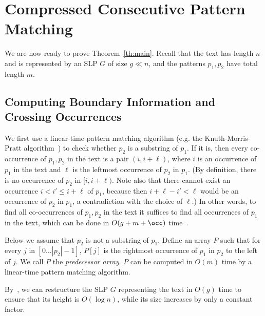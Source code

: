  
\section{Compressed Consecutive Pattern Matching}
\label{pmgapped:sec:consec}
We are now ready to prove Theorem~\ref{th:main}. Recall that the text has length $n$ and is represented by an SLP $G$ of size $g \ll n$, and the patterns $p_1,p_2$ have total length $m$.

\subsection{Computing Boundary Information and Crossing Occurrences}
\label{pmgapped:sec:boundary}
We first use a linear-time pattern matching algorithm (e.g. the Knuth-Morris-Pratt algorithm~\cite{KMP}) to check whether $p_2$ is a substring of $p_1$. If it is, then every co-occurrence of $p_1, p_2$ in the text is a pair $(i,i+\ell)$, where $i$ is an occurrence of $p_1$ in the text and $\ell$ is the leftmost occurrence of $p_2$ in $p_1$. (By definition, there is no occurrence of $p_2$ in $[i,i+\ell)$. Note also that there cannot exist an occurrence $i < i' \le i+\ell$ of $p_1$, because then $i+\ell-i' < \ell$ would be an occurrence of $p_2$ in $p_1$, a contradiction with the choice of $\ell$.) In other words, to find all co-occurrences of $p_1,p_2$ in the text it suffices to find all occurrences of $p_1$ in the text, which can be done in $O(g+m+\occ)$ time~\cite{DBLP:conf/soda/GanardiG22}.

Below we assume that $p_2$ is not a substring of $p_1$. Define an array $P$ such that for every $j$ in $[0\dots |p_2|-1]$, $P[j]$ is the rightmost occurrence of $p_1$ in $p_2$ to the left of $j$. We call $P$ the \emph{predecessor array}. $P$ can be computed in $O(m)$ time by a linear-time pattern matching algorithm.

By~\cite{DBLP:conf/focs/GanardiJL19}, we can restructure the SLP $G$ representing the text in $O(g)$ time to ensure that its height is $O(\log n)$, while its size increases by only a constant factor. 

